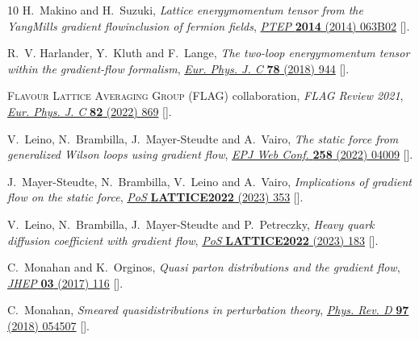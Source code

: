\begin{thebibliography}{10}
H.~Makino and H.~Suzuki, \emph{{Lattice energy\textendash{}momentum tensor from
  the Yang\textendash{}Mills gradient flow\textemdash{}inclusion of fermion
  fields}}, \href{https://doi.org/10.1093/ptep/ptu070}{\emph{PTEP} {\bfseries
  2014} (2014) 063B02} [\href{https://arxiv.org/abs/1403.4772}{{}}].

R.~V. Harlander, Y.~Kluth and F.~Lange, \emph{{The two-loop
  energy\textendash{}momentum tensor within the gradient-flow formalism}},
  \href{https://doi.org/10.1140/epjc/s10052-018-6415-7}{\emph{Eur. Phys. J. C}
  {\bfseries 78} (2018) 944}
  [\href{https://arxiv.org/abs/1808.09837}{{}}].

{\scshape Flavour Lattice Averaging Group (FLAG)} collaboration, \emph{{FLAG
  Review 2021}},
  \href{https://doi.org/10.1140/epjc/s10052-022-10536-1}{\emph{Eur. Phys. J. C}
  {\bfseries 82} (2022) 869}
  [\href{https://arxiv.org/abs/2111.09849}{{}}].

V.~Leino, N.~Brambilla, J.~Mayer-Steudte and A.~Vairo, \emph{{The static force
  from generalized Wilson loops using gradient flow}},
  \href{https://doi.org/10.1051/epjconf/202225804009}{\emph{EPJ Web Conf.}
  {\bfseries 258} (2022) 04009}
  [\href{https://arxiv.org/abs/2111.10212}{{}}].

J.~Mayer-Steudte, N.~Brambilla, V.~Leino and A.~Vairo, \emph{{Implications of
  gradient flow on the static force}},
  \href{https://doi.org/10.22323/1.430.0353}{\emph{PoS} {\bfseries LATTICE2022}
  (2023) 353} [\href{https://arxiv.org/abs/2212.12400}{{}}].

V.~Leino, N.~Brambilla, J.~Mayer-Steudte and P.~Petreczky, \emph{{Heavy quark
  diffusion coefficient with gradient flow}},
  \href{https://doi.org/10.22323/1.430.0183}{\emph{PoS} {\bfseries LATTICE2022}
  (2023) 183} [\href{https://arxiv.org/abs/2212.10941}{{}}].

C.~Monahan and K.~Orginos, \emph{{Quasi parton distributions and the gradient
  flow}}, \href{https://doi.org/10.1007/JHEP03(2017)116}{\emph{JHEP} {\bfseries
  03} (2017) 116} [\href{https://arxiv.org/abs/1612.01584}{{}}].

C.~Monahan, \emph{{Smeared quasidistributions in perturbation theory}},
  \href{https://doi.org/10.1103/PhysRevD.97.054507}{\emph{Phys. Rev. D}
  {\bfseries 97} (2018) 054507}
  [\href{https://arxiv.org/abs/1710.04607}{{}}].


\end{thebibliography}
